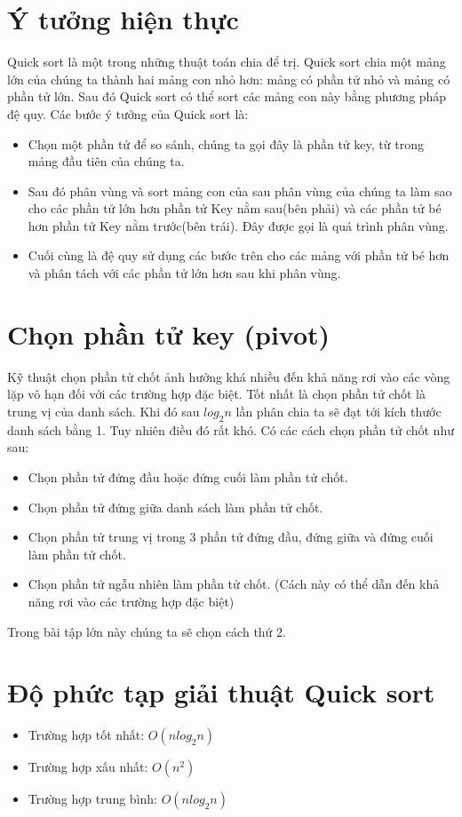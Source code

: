 \documentclass[a4paper]{article}
\begin{document}
\section{Ý tưởng hiện thực}
Quick sort là một trong những thuật toán chia để trị. Quick sort chia một mảng lớn của chúng ta thành hai mảng con nhỏ hơn: mảng có phần tử nhỏ và mảng có phần tử lớn. Sau đó Quick sort có thể sort các mảng con này bằng phương pháp đệ quy. Các bước ý tưởng của Quick sort là:
\begin{itemize}
	\item Chọn một phần tử để so sánh, chúng ta gọi đây là phần tử key, từ trong mảng đầu tiên của chúng ta.
	\item Sau đó phân vùng và sort mảng con của sau phân vùng của chúng ta làm sao cho các phần tử lớn hơn phần tử Key nằm sau(bên phải) và các phần tử bé hơn phần tử Key nằm trước(bên trái). Đây được gọi là quá trình phân vùng.
	\item Cuối cùng là đệ quy sử dụng các bước trên cho các mảng với phần tử bé hơn và phân tách với các phần tử lớn hơn sau khi phân vùng.
\end{itemize}
\section{Chọn phần tử key (pivot)}
Kỹ thuật chọn phần tử chốt ảnh hưởng khá nhiều đến khả năng rơi vào các vòng lặp vô hạn đối với các trường hợp đặc biệt. Tốt nhất là chọn phần tử chốt là trung vị của danh sách. Khi đó sau $log_2 n$ lần phân chia ta sẽ đạt tới kích thước danh sách bằng 1. Tuy nhiên điều đó rất khó. Có các cách chọn phần tử chốt như sau:
\begin{itemize}
	\item Chọn phần tử đứng đầu hoặc đứng cuối làm phần tử chốt.
	\item Chọn phần tử đứng giữa danh sách làm phần tử chốt.
	\item Chọn phần tử trung vị trong 3 phần tử đứng đầu, đứng giữa và đứng cuối làm phần tử chốt.
	\item Chọn phần tử ngẫu nhiên làm phần tử chốt. (Cách này có thể dẫn đến khả năng rơi vào các trường hợp đặc biệt)	
\end{itemize}
Trong bài tập lớn này chúng ta sẽ chọn cách thứ 2.
\section{Độ phức tạp giải thuật Quick sort}
\begin{itemize}
	\item Trường hợp tốt nhất: $O(nlog_2 n)$
	\item Trường hợp xấu nhất: $O(n^2)$
	\item Trường hợp trung bình: $O(nlog_2 n)$
\end{itemize}
\end{document}
